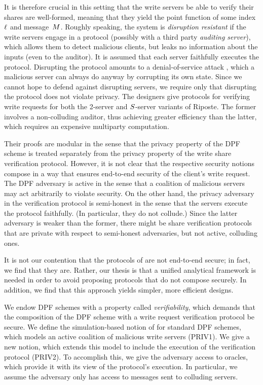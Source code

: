 It is therefore crucial in this setting that the write servers be able to verify
their shares are well-formed, meaning that they yield the point function of some
index~$\ell$ and message~$M$. Roughly speaking, the system is
\emph{disruption resistant} \cite{riposte} if the write servers engage in a
protocol (possibly with a third party \emph{auditing server}), which allows them
to detect malicious clients, but leaks no information about the inputs (even to
the auditor). It is assumed that each server faithfully executes the protocol.
Disrupting the protocol amounts to a denial-of-service attack \cite{riposte},
which a malicious server can always do anyway by corrupting its own state.
Since we cannot hope to defend against disrupting servers, we require only that
disrupting the protocol does not violate privacy.
The designers give protocols for verifying write requests for both the 2-server
and $S$-server variants of Riposte. The former involves a non-colluding
auditor, thus achieving greater efficiency than the latter, which requires an
expensive multiparty computation.

Their proofs are modular in the sense that the privacy property of the DPF
scheme is treated separately from the privacy property of the write share
verification protocol. However, it is not clear that the respective security
notions compose in a way that ensures end-to-end security of the client's write
request. The DPF adversary is active in the sense that a coalition of
malicious servers may act arbitrarily to violate security. On the other hand,
the privacy adversary in the verification protocol is semi-honest in the sense
that the servers execute the protocol faithfully. (In particular, they do not
collude.) Since the latter adversary is weaker than the former, there might be
share verification protocols that are private with respect to semi-honest
adversaries, but not active, colluding ones.

It is not our contention that the protocols of \cite{riposte} are not end-to-end
secure; in fact, we find that they are. Rather, our thesis is that a unified
analytical framework is needed in order to avoid proposing protocols that do not
compose securely. In addition, we find that this approach yields simpler, more
efficient designs.
\fi

We endow DPF schemes with a property called \emph{verifiability}, which demands
that the composition of the DPF scheme with a write request verification protocol
be secure. We define the simulation-based notion of \cite{dpf,riposte} for
standard DPF schemes, which models an active coalition of malicious write
servers (PRIV1). We give a new notion, which extends this model to include
the execution of the verification protocol (PRIV2). To accomplish this, we give
the adversary access to oracles, which provide it with its view of the
protocol's execution. In particular, we assume the adversary only has access to
messages sent to colluding servers.

